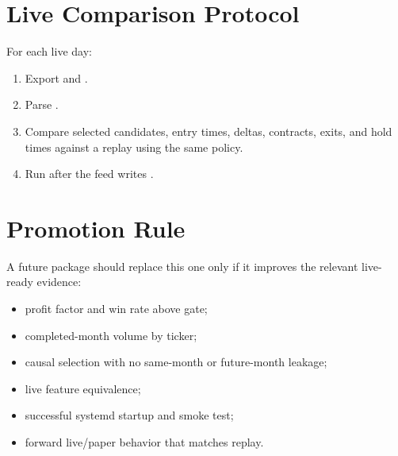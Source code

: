 \documentclass[11pt,a4paper]{article}
\begin{document}
\section{Live Comparison Protocol}

For each live day:

\begin{enumerate}
  \item Export  and .
  \item Parse .
  \item Compare selected candidates, entry times, deltas, contracts, exits, and hold times against a replay using the same policy.
  \item Run  after the feed writes .
\end{enumerate}

\section{Promotion Rule}

A future package should replace this one only if it improves the relevant live-ready evidence:

\begin{itemize}
  \item profit factor and win rate above gate;
  \item completed-month volume by ticker;
  \item causal selection with no same-month or future-month leakage;
  \item live feature equivalence;
  \item successful systemd startup and smoke test;
  \item forward live/paper behavior that matches replay.
\end{itemize}
\end{document}
